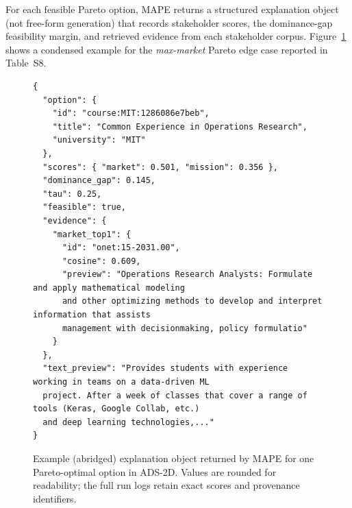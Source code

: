 \documentclass[sigconf,review]{acmart}
\newcommand{\MAPE}{\textsc{MAPE}\xspace}
\begin{document}






For each feasible Pareto option, \MAPE returns a structured explanation object (not free-form generation) that records stakeholder scores, the dominance-gap feasibility margin, and retrieved evidence from each stakeholder corpus. Figure~\ref{fig:supp-explobj} shows a condensed example for the \textit{max-market} Pareto edge case reported in Table~S8.

\begin{figure}[h]
  \centering
  \small
  \begin{minipage}{0.96\linewidth}
\begin{verbatim}
{
  "option": {
    "id": "course:MIT:1286086e7beb",
    "title": "Common Experience in Operations Research",
    "university": "MIT"
  },
  "scores": { "market": 0.501, "mission": 0.356 },
  "dominance_gap": 0.145,
  "tau": 0.25,
  "feasible": true,
  "evidence": {
    "market_top1": {
      "id": "onet:15-2031.00",
      "cosine": 0.609,
      "preview": "Operations Research Analysts: Formulate and apply mathematical modeling 
      and other optimizing methods to develop and interpret information that assists 
      management with decisionmaking, policy formulatio"
    }
  },
  "text_preview": "Provides students with experience working in teams on a data-driven ML 
  project. After a week of classes that cover a range of tools (Keras, Google Collab, etc.) 
  and deep learning technologies,..."
}
\end{verbatim}
  \end{minipage}
  \caption{Example (abridged) explanation object returned by \MAPE for one Pareto-optimal option in ADS-2D. Values are rounded for readability; the full run logs retain exact scores and provenance identifiers.}
  \label{fig:supp-explobj}
\end{figure}
\end{document}
